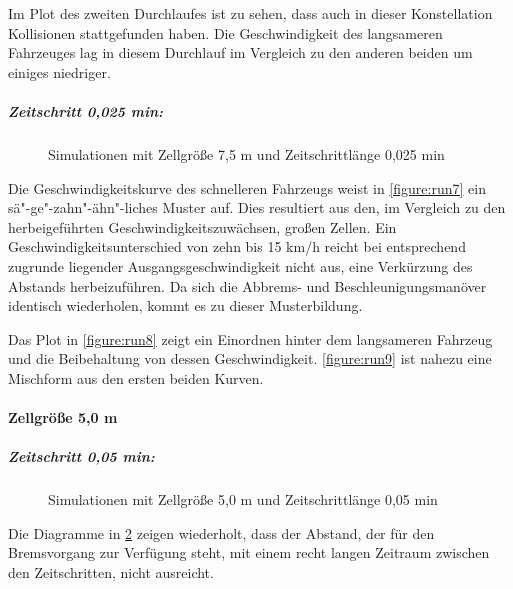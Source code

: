 Im Plot des zweiten Durchlaufes ist zu sehen, dass auch in dieser Konstellation Kollisionen stattgefunden haben.
Die Geschwindigkeit des langsameren Fahrzeuges lag in diesem Durchlauf im Vergleich zu den anderen beiden um einiges niedriger.

\subparagraph*{Zeitschritt 0,025 min:}
\begin{figure}[hptb]
  \centering 
   \qquad 
   \qquad 
  \caption{Simulationen mit Zellgröße 7,5 m und Zeitschrittlänge 0,025 min} 
  \label{figure:run7-9}
\end{figure}

Die Geschwindigkeitskurve des schnelleren Fahrzeugs weist in \cref{figure:run7} ein sä"-ge"-zahn"-ähn"-liches Muster auf.
Dies resultiert aus den, im Vergleich zu den herbeigeführten Geschwindigkeitszuwächsen, großen Zellen.
Ein Geschwindigkeitsunterschied von zehn bis 15 km/h reicht bei entsprechend zugrunde liegender Ausgangsgeschwindigkeit nicht aus, eine Verkürzung des Abstands herbeizuführen.
Da sich die Abbrems- und Beschleunigungsmanöver identisch wiederholen, kommt es zu dieser Musterbildung.

Das Plot in \cref{figure:run8} zeigt ein Einordnen hinter dem langsameren Fahrzeug und die Beibehaltung von dessen Geschwindigkeit.
\cref{figure:run9} ist nahezu eine Mischform aus den ersten beiden Kurven.


\paragraph*{Zellgröße 5,0 m}
\hfill 
\subparagraph*{Zeitschritt 0,05 min:}
\begin{figure}[hptb]
  \centering 
   \qquad 
   \qquad 
  \caption{Simulationen mit Zellgröße 5,0 m und Zeitschrittlänge 0,05 min} 
  \label{figure:run14-16}
\end{figure}

Die Diagramme in \cref{figure:run14-16} zeigen wiederholt, dass der Abstand, der für den Bremsvorgang zur Verfügung steht, mit einem recht langen Zeitraum zwischen den Zeitschritten, nicht ausreicht.

